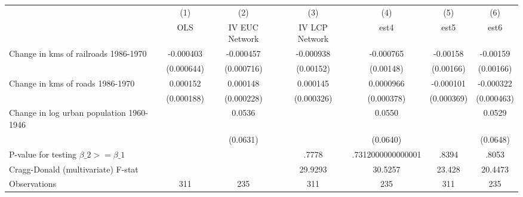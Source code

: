 {
\def\sym#1{\ifmmode^{#1}\else\(^{#1}\)\fi}
\begin{tabular}{l*{6}{c}}
\hline\hline
                &\multicolumn{1}{c}{(1)}&\multicolumn{1}{c}{(2)}&\multicolumn{1}{c}{(3)}&\multicolumn{1}{c}{(4)}&\multicolumn{1}{c}{(5)}&\multicolumn{1}{c}{(6)}\\
                &\multicolumn{1}{c}{OLS}&\multicolumn{1}{c}{IV EUC Network}&\multicolumn{1}{c}{IV LCP Network}&\multicolumn{1}{c}{est4}&\multicolumn{1}{c}{est5}&\multicolumn{1}{c}{est6}\\
\hline
Change in kms of railroads 1986-1970&-0.000403         &-0.000457         &-0.000938         &-0.000765         & -0.00158         & -0.00159         \\
                &(0.000644)         &(0.000716)         &(0.00152)         &(0.00148)         &(0.00166)         &(0.00166)         \\
[1em]
Change in kms of roads 1986-1970& 0.000152         & 0.000148         & 0.000145         &0.0000966         &-0.000101         &-0.000322         \\
                &(0.000188)         &(0.000228)         &(0.000326)         &(0.000378)         &(0.000369)         &(0.000463)         \\
[1em]
Change in log urban population 1960-1946&                  &   0.0536         &                  &   0.0550         &                  &   0.0529         \\
                &                  & (0.0631)         &                  & (0.0640)         &                  & (0.0648)         \\
\hline
P-value for testing $\beta\_{2} >= \beta\_{1}$&                  &                  &    .7778         &.7312000000000001         &    .8394         &    .8053         \\
Cragg-Donald (multivariate) F-stat&                  &                  &  29.9293         &  30.5257         &   23.428         &  20.4473         \\
Observations    &      311         &      235         &      311         &      235         &      311         &      235         \\
\hline\hline
\end{tabular}
}
